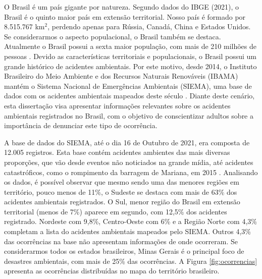 
O Brasil é um país gigante por natureza. Segundo dados do IBGE (2021), o Brasil é o quinto maior país em extensão territorial. Nosso país é formado por 8.515.767 km$^2$, perdendo apenas para Rússia, Canadá, China e Estados Unidos. Se considerarmos o aspecto populacional, o Brasil também se destaca. Atualmente o Brasil possui a sexta maior população, com mais de 210 milhões de pessoas \cite{ibge2021}. Devido as características territoriais e populacionais, o Brasil possui um grande histórico de acidentes ambientais. Por este motivo, desde 2014, o Instituto Brasileiro do Meio Ambiente e dos Recursos Naturais Renováveis (IBAMA) mantém o Sistema Nacional de Emergências Ambientais (SIEMA), uma base de dados com os acidentes ambientais mapeados deste século \cite{ibama2021}. Diante deste cenário, esta dissertação visa apresentar informações relevantes sobre os acidentes ambientais registrados no Brasil, com o objetivo de conscientizar adultos sobre a importância de denunciar este tipo de ocorrência.


A base de dados do SIEMA, até o dia 16 de Outubro de 2021, era composta de 12.005 registros. Esta base contém acidentes ambientes das mais diversas proporções, que vão desde eventos não noticiados na grande mídia, até acidentes catastróficos, como o rompimento da barragem de Mariana, em 2015 \cite{wanderley2016desastre}. Analisando os dados, é possível observar que mesmo sendo uma das menores regiões em território, pouco menos de 11\%, o Sudeste se destaca com mais de 63\% dos acidentes ambientais registrados. O Sul, menor região do Brasil em extensão territorial (menos de 7\%) aparece em segundo, com 12,5\% dos acidentes registrado. Nordeste com 9,8\%, Centro-Oeste com 6\% e a Região Norte com 4,3\% completam a lista do acidentes ambientais mapeados pelo SIEMA. Outros 4,3\% das ocorrências na base não apresentam informações de onde ocorreram. Se considerarmos todos os estados brasileiros, Minas Gerais é o principal foco de desastres ambientais, com mais de 25\% das ocorrências. A Figura \ref{fig:ocorrencias} apresenta as ocorrências distribuídas no mapa do território brasileiro.

